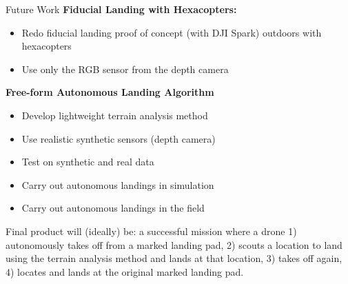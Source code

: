 \documentclass[final, 20pt]{beamer}
\newlength{\colwidth}
\begin{document}
\begin{frame}[t]
\begin{columns}[t]
\begin{column}{\colwidth}
\begin{block}{Future Work}
      \vspace*{-0.5cm}
      \textbf{Fiducial Landing with Hexacopters:}
      \vspace*{-0.5cm}
      \begin{itemize}
          \item Redo fiducial landing proof of concept (with DJI Spark) outdoors with hexacopters
          \item Use only the RGB sensor from the depth camera
      \end{itemize}

      \vspace*{-0.5cm}
      \textbf{Free-form Autonomous Landing Algorithm}
      \vspace{-0.5cm}
      \begin{itemize}
          \item Develop lightweight terrain analysis method
          \item Use realistic synthetic sensors (depth camera)
          \item Test on synthetic and real data
          \item Carry out autonomous landings in simulation
          \item Carry out autonomous landings in the field
      \end{itemize}
      \vspace*{-0.5cm}
      Final product will (ideally) be: a successful mission where a drone 1) autonomously takes off from a marked landing pad,
      2) scouts a location to land using the terrain analysis method and lands at that location, 3) takes off again, 4) locates and lands at the original marked landing pad.

  \end{block}


\end{column}
\end{columns}
\end{frame}
\end{document}
